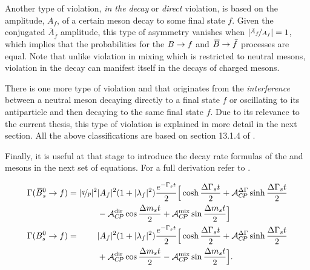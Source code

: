Another type of \CP violation, {\it in the decay} or {\it direct} \CP violation, is based on the
amplitude, $A_f$, of a certain meson decay to some final state $f$. Given the \CP conjugated $\bar{A}_{\bar{f}}$
amplitude, this type of asymmetry vanishes when $|\nicefrac{\bar{A}_{\bar{f}}}{A_f}| = 1$,
which implies that the probabilities for the $B \rightarrow f$ and $\kern 0.18em\overline{\kern -0.18em B}{} \rightarrow \bar{f}$ processes are equal.
Note that unlike \CP violation in mixing which is restricted to neutral mesons,
\CP violation in the decay can manifest itself in the decays of charged mesons.

There is one more type of \CP violation and that originates from the {\it interference} between
a neutral meson decaying directly to a final state $f$ or oscillating to its antiparticle and then decaying
to the same final state $f$. Due to its relevance to the current thesis, this type of \CP violation is explained
in more detail in the next section. All the above classifications are based on section 13.1.4 of \cite{PDG}.

Finally, it is useful at that stage to introduce the decay rate formulas of the \Bs and \Bsb mesons
in the next set of equations. For a full derivation refer to \cite{PDG,DeBruyn-thesis,jeroenThesis}.

\newcommand{\ampSq}{\ensuremath{|A_f|^2}\xspace}
\newcommand{\ampBSq}{\ensuremath{|\bar{A}_f|^2}\xspace}
\newcommand{\lambSq}{\ensuremath{|\lambda_f|^2}\xspace}
\newcommand{\eGammast}{\ensuremath{e^{-\Gamma_s t}}\xspace}
\newcommand{\qopSq}{\ensuremath{|\qoverp|^2}\xspace}
\newcommand{\DeltaGammat}{\ensuremath{\frac{\Delta\Gamma_s t}{2}}\xspace}
\newcommand{\DeltaMt}{\ensuremath{\frac{\Delta m_s t}{2}}\xspace}

\begin{subequations}
 \label{decay_rate_master_eqs}
 \begin{align}
 \centering
    \Gamma(\Bsb \to f) =          \qopSq & \ampSq (1+\lambSq) \frac{\eGammast}{2} \Big[ \cosh\DeltaGammat + \Acp{\Delta\Gamma}\sinh\DeltaGammat \nonumber \\
                                         &  - \Acp{\rm dir}\cos\DeltaMt + \Acp{\rm mix}\sin\DeltaMt \Big]  \\
    \Gamma(\Bs \to f) = \phantom{\qopSq} & \ampSq (1+\lambSq) \frac{\eGammast}{2} \Big[ \cosh\DeltaGammat + \Acp{\Delta\Gamma}\sinh\DeltaGammat \nonumber  \\
                                         & + \Acp{\rm dir}\cos\DeltaMt - \Acp{\rm mix}\sin\DeltaMt \Big].
 \end{align}
\end{subequations}

